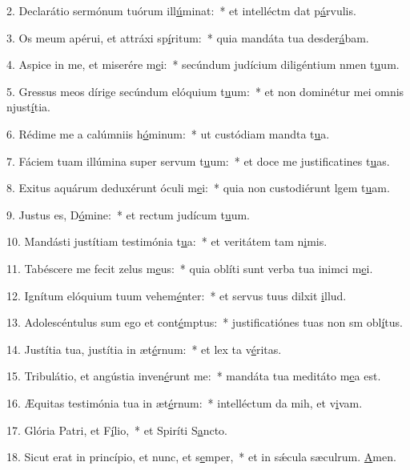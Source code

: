 2. Declarátio sermónum tuórum ill\uline{ú}minat:~* et intelléctm dat p\uline{á}rvulis.\par 
3. Os meum apérui, et attráxi sp\uline{í}ritum:~* quia mandáta tua desder\uline{á}bam.\par 
4. Aspice in me, et miserére m\uline{e}i:~* secúndum judícium diligéntium nmen t\uline{u}um.\par 
5. Gressus meos dírige secúndum elóquium t\uline{u}um:~* et non dominétur mei omnis njust\uline{í}tia.\par 
6. Rédime me a calúmniis h\uline{ó}minum:~* ut custódiam mandta t\uline{u}a.\par 
7. Fáciem tuam illúmina super servum t\uline{u}um:~* et doce me justificatines t\uline{u}as.\par 
8. Exitus aquárum deduxérunt óculi m\uline{e}i:~* quia non custodiérunt lgem t\uline{u}am.\par 
9. Justus es, D\uline{ó}mine:~* et rectum judícum t\uline{u}um.\par 
10. Mandásti justítiam testimónia t\uline{u}a:~* et veritátem tam n\uline{i}mis.\par 
11. Tabéscere me fecit zelus m\uline{e}us:~* quia oblíti sunt verba tua inimci m\uline{e}i.\par 
12. Ignítum elóquium tuum vehem\uline{é}nter:~* et servus tuus dilxit \uline{i}llud.\par 
13. Adolescéntulus sum ego et cont\uline{é}mptus:~* justificatiónes tuas non sm obl\uline{í}tus.\par 
14. Justítia tua, justítia in æt\uline{é}rnum:~* et lex ta v\uline{é}ritas.\par 
15. Tribulátio, et angústia inven\uline{é}runt me:~* mandáta tua meditáto m\uline{e}a est.\par 
16. Æquitas testimónia tua in æt\uline{é}rnum:~* intelléctum da mih, et v\uline{i}vam.\par 
17. Glória Patri, et F\uline{í}lio,~* et Spiríti S\uline{a}ncto.\par 
18. Sicut erat in princípio, et nunc, et s\uline{e}mper,~* et in sǽcula sæculrum. \uline{A}men.\par 
